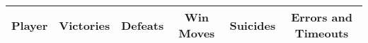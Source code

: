 \documentclass[pdftex,...]{article}%
\begin{document}
\begin{tabular}[b]{c|cc|ccc}
    Player & Victories & Defeats & Win Moves & Suicides & Errors and Timeouts \\
    \hline
    
    \hline
\end{tabular}




\end{document}
